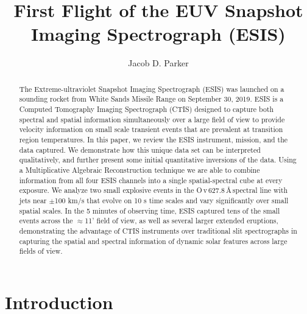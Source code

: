 \renewcommand{\arcsec}{$^{\prime\prime}$} %
\renewcommand{\arcmin}{$^{\prime}$}
\newcommand{\rts}[1]{{\color{violet} RTS: #1}} %
\newcommand{\jdp}[1]{{\color{red} JDP: #1}} %
\newcommand{\cck}[1]{{\color{brown} CCK: #1}} %
\newcommand{\amy}[1]{{\color{cyan} ARW: #1}}

\newcommand{\spectralline}[3]{#1\,{\sc #2}\,#3\,\AA \,}
\newcommand{\ov}{\spectralline{O}{v}{627.8}}
\newcommand{\mgxbright}{\spectralline{Mg}{x}{609.8}}
\newcommand{\hei}{\spectralline{He}{i}{584.3}}



\title{First Flight of the EUV Snapshot Imaging Spectrograph (ESIS)}

\author{Jacob D. Parker}

\begin{abstract}
  	The Extreme-ultraviolet Snapshot Imaging Spectrograph (ESIS) was launched on a sounding rocket from White Sands Missile Range on September 30, 2019.
  	ESIS is a Computed Tomography Imaging Spectrograph (CTIS) designed to capture both spectral and spatial information simultaneously over a large field of view to provide velocity information on small scale transient events that are prevalent at transition region temperatures.
  	In this paper, we review the ESIS instrument, mission, and the data captured.
  	We demonstrate how this unique data set can be interpreted qualitatively, and further present some initial quantitative inversions of the data.
  	Using a Multiplicative Algebraic Reconstruction technique we are able to combine information from all four ESIS channels into a single spatial-spectral cube at every exposure.
  	We analyze two small explosive events in the \ov spectral line with jets  near $\pm$100 km/s that evolve on 10 s time scales and vary significantly over small spatial scales.
  	In the 5 minutes of observing time, ESIS captured tens of the small events across the $\approx$11' field of view, as well as several larger extended eruptions, demonstrating the advantage of CTIS instruments over traditional slit spectrographs in capturing the spatial and spectral information of dynamic solar features across large fields of view.
  	
\end{abstract} 

\section{Introduction}

